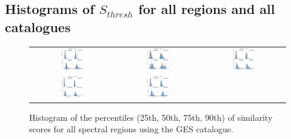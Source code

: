 \documentclass{aa}
\begin{document}
\begin{appendix}
\onecolumn
\section{Histograms of $S_{thresh}$ for all regions and all catalogues}
\label{app:B}

\begin{figure}[htbp]
    \centering
    \begin{tabular}{ccc}
        \includegraphics[width=0.28\textwidth]{Plots/simil_thresh_hists/simil_thresh_histograms_R2_ges.pdf} & \includegraphics[width=0.28\textwidth]{Plots/simil_thresh_hists/simil_thresh_histograms_R3_ges.pdf} & \includegraphics[width=0.28\textwidth]{Plots/simil_thresh_hists/simil_thresh_histograms_R4_ges.pdf}  \\ \includegraphics[width=0.28\textwidth]{Plots/simil_thresh_hists/simil_thresh_histograms_R5_ges.pdf} &        \includegraphics[width=0.28\textwidth]{Plots/simil_thresh_hists/simil_thresh_histograms_R6_ges.pdf} & 
        \\
    \end{tabular}
    \caption{Histogram of the percentiles (25th, 50th, 75th, 90th) of similarity scores for all spectral regions using the GES catalogue.}
\end{figure}


\end{appendix}
\end{document}
